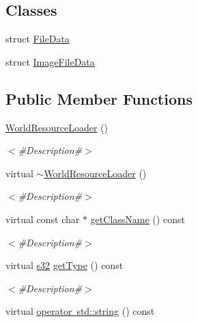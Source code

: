 \subsection*{Classes}
\begin{DoxyCompactItemize}
\item 
struct \mbox{\hyperlink{structnjli_1_1_world_resource_loader_1_1_file_data}{File\+Data}}
\item 
struct \mbox{\hyperlink{structnjli_1_1_world_resource_loader_1_1_image_file_data}{Image\+File\+Data}}
\end{DoxyCompactItemize}
\subsection*{Public Member Functions}
\begin{DoxyCompactItemize}
\item 
\mbox{\hyperlink{classnjli_1_1_world_resource_loader_a0bdde94c5d76a1bba1f91980a5e81582}{World\+Resource\+Loader}} ()
\begin{DoxyCompactList}\small\item\em $<$\#\+Description\#$>$ \end{DoxyCompactList}\item 
virtual \mbox{\hyperlink{classnjli_1_1_world_resource_loader_a47f64f7498c3620740efb3e15ba89a92}{$\sim$\+World\+Resource\+Loader}} ()
\begin{DoxyCompactList}\small\item\em $<$\#\+Description\#$>$ \end{DoxyCompactList}\item 
virtual const char $\ast$ \mbox{\hyperlink{classnjli_1_1_world_resource_loader_ab568027aba2b36f2bdf12db437b5500a}{get\+Class\+Name}} () const
\begin{DoxyCompactList}\small\item\em $<$\#\+Description\#$>$ \end{DoxyCompactList}\item 
virtual \mbox{\hyperlink{_util_8h_aa62c75d314a0d1f37f79c4b73b2292e2}{s32}} \mbox{\hyperlink{classnjli_1_1_world_resource_loader_a71de9ddba0101505458834f0fffba6b6}{get\+Type}} () const
\begin{DoxyCompactList}\small\item\em $<$\#\+Description\#$>$ \end{DoxyCompactList}\item 
virtual \mbox{\hyperlink{classnjli_1_1_world_resource_loader_aceb532e164be0cf0cc7d6ec6e96dcaa6}{operator std\+::string}} () const

\end{DoxyCompactItemize}
